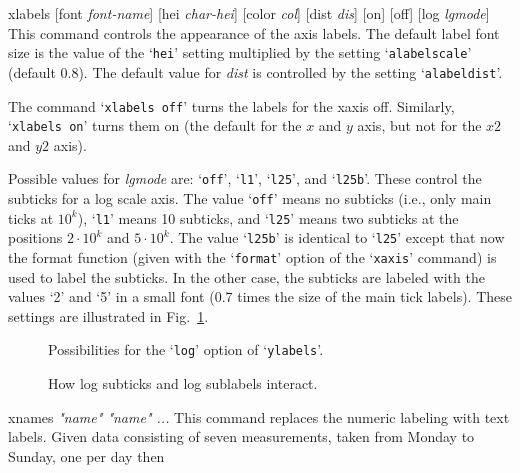 \begin{commanddescription}
\item[{\sf xlabels [font {\it font-name}] [hei {\it char-hei}] [color {\it col}] [dist {\it dis}] [on] [off] [log {\it lgmode}]}]
This command controls the appearance of the axis labels. The default label font size is the value of the `\texttt{hei}' setting multiplied by the setting `\texttt{alabelscale}' (default 0.8). The default value for {\it dist} is controlled by the setting `\texttt{alabeldist}'.

The command `\texttt{xlabels off}' turns the labels for the xaxis off. Similarly, `\texttt{xlabels on}' turns them on (the default for the $x$ and $y$ axis, but not for the $x2$ and $y2$ axis).

Possible values for {\it lgmode} are: `\texttt{off}', `\texttt{l1}', `\texttt{l25}', and `\texttt{l25b}'. These control the subticks for a log scale axis. The value `\texttt{off}' means no subticks (i.e., only main ticks at $10^k$), `\texttt{l1}' means 10 subticks, and `\texttt{l25}' means two subticks at the positions $2\cdot 10^k$ and $5\cdot 10^k$. The value `\texttt{l25b}' is identical to `\texttt{l25}' except that now the format function (given with the `\texttt{format}' option of the `\texttt{xaxis}' command) is used to label the subticks. In the other case, the subticks are labeled with the values `2' and `5' in a small font (0.7 times the size of the main tick labels). These settings are illustrated in Fig.~\ref{loglab:fig}.

\begin{figure}[tb]
\centering
\mbox{}
\caption{\label{loglab:fig}Possibilities for the `\texttt{log}' option of `\texttt{ylabels}'.}
\end{figure}

\begin{figure}[tb]
\centering
\mbox{}
\caption{\label{logsubt:fig}How log subticks and log sublabels interact.}
\end{figure}

\item[{\sf xnames {\it "name"  "name" ...}}  ]
This command replaces the numeric labeling with text labels. Given data consisting of seven measurements, taken from Monday to Sunday, one per day then


\end{commanddescription}
